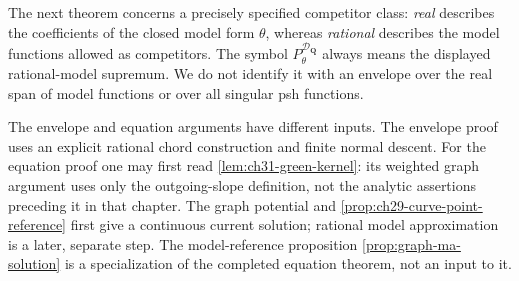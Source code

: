 
The next theorem concerns a precisely specified competitor class:
\emph{real} describes the coefficients of the closed model form
\(\theta\), whereas \emph{rational} describes the model functions
allowed as competitors.  The symbol
\(P_\theta^{\mathcal D_{\mathbf Q}}\) always means the displayed
rational-model supremum.  We do not identify it with an envelope
over the real span of model functions or over all singular psh functions.

The envelope and equation arguments have different inputs.
The envelope proof uses an explicit rational chord construction and
finite normal descent.  For the equation proof one may first read
\cref{lem:ch31-green-kernel}: its weighted graph argument uses only
the outgoing-slope definition, not the analytic assertions preceding
it in that chapter.  The graph potential and
\cref{prop:ch29-curve-point-reference} first give a continuous current
solution; rational model approximation is a later, separate step.
The model-reference proposition \cref{prop:graph-ma-solution} is
a specialization of the completed equation theorem, not an input to it.

